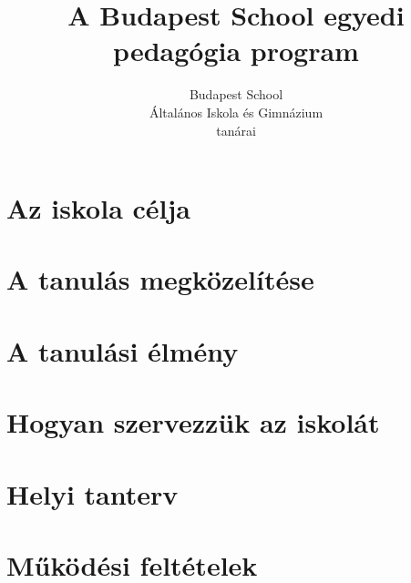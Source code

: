 \documentclass[10pt,openright,twoside]{book}
\begin{document}
\let\apageref\pageref
\let\autocite\citep

\title{A Budapest School egyedi pedagógia program}
\author{Budapest School \\
Általános Iskola és Gimnázium\\ 
tanárai}
\maketitle

\pagestyle{empty}

% 


\tableofcontents
\mainmatter
\pagestyle{fancy}
\chapter{Az iskola célja}






\chapter{A tanulás megközelítése}





\chapter{A tanulási élmény}










\chapter{Hogyan szervezzük az iskolát}







\chapter{Helyi tanterv}











% 
\chapter{Működési feltételek}


\backmatter

\end{document}
